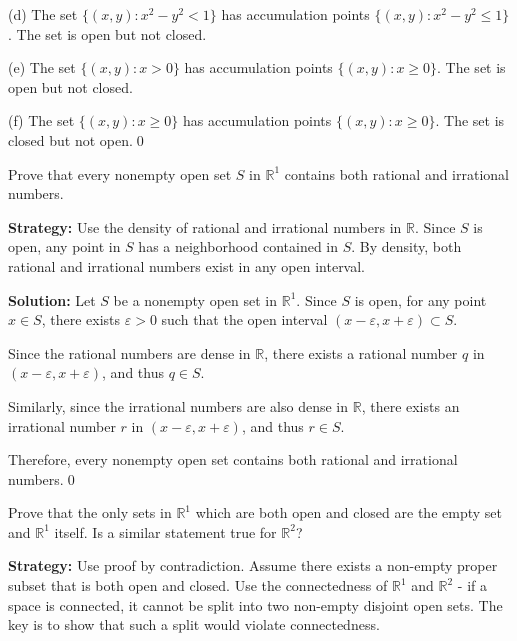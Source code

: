 (d) The set $\{(x,y) : x^2 - y^2 < 1\}$ has accumulation points $\{(x,y) : x^2 - y^2 \leq 1\}$. The set is open but not closed.

(e) The set $\{(x,y) : x > 0\}$ has accumulation points $\{(x,y) : x \geq 0\}$. The set is open but not closed.

(f) The set $\{(x,y) : x \geq 0\}$ has accumulation points $\{(x,y) : x \geq 0\}$. The set is closed but not open.\qed


\begin{problembox}
\begin{problemstatement}
Prove that every nonempty open set $S$ in $\mathbb{R}^1$ contains both rational and irrational numbers.
\end{problemstatement}
\end{problembox}

\noindent\textbf{Strategy:} Use the density of rational and irrational numbers in $\mathbb{R}$. Since $S$ is open, any point in $S$ has a neighborhood contained in $S$. By density, both rational and irrational numbers exist in any open interval.

\bigskip\noindent\textbf{Solution:} Let $S$ be a nonempty open set in $\mathbb{R}^1$. Since $S$ is open, for any point $x \in S$, there exists $\varepsilon > 0$ such that the open interval $(x-\varepsilon, x+\varepsilon) \subset S$.

Since the rational numbers are dense in $\mathbb{R}$, there exists a rational number $q$ in $(x-\varepsilon, x+\varepsilon)$, and thus $q \in S$.

Similarly, since the irrational numbers are also dense in $\mathbb{R}$, there exists an irrational number $r$ in $(x-\varepsilon, x+\varepsilon)$, and thus $r \in S$.

Therefore, every nonempty open set contains both rational and irrational numbers.\qed


\begin{problembox}
\begin{problemstatement}
Prove that the only sets in $\mathbb{R}^1$ which are both open and closed are the empty set and $\mathbb{R}^1$ itself. Is a similar statement true for $\mathbb{R}^2$?
\end{problemstatement}
\end{problembox}

\noindent\textbf{Strategy:} Use proof by contradiction. Assume there exists a non-empty proper subset that is both open and closed. Use the connectedness of $\mathbb{R}^1$ and $\mathbb{R}^2$ - if a space is connected, it cannot be split into two non-empty disjoint open sets. The key is to show that such a split would violate connectedness.

